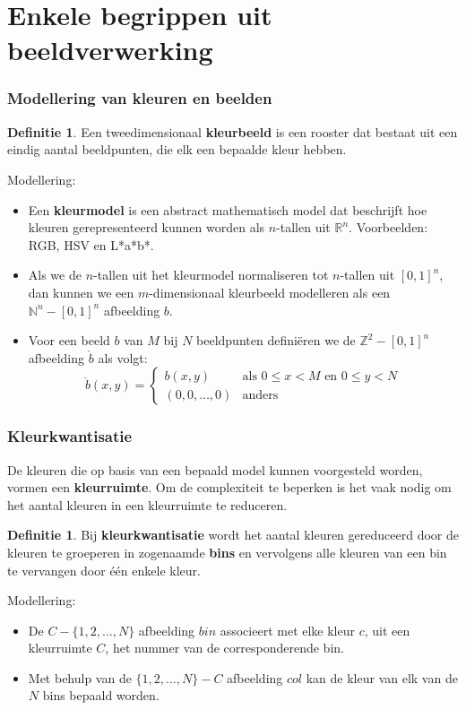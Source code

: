\documentclass[dutch]{beamer}
\theoremstyle{definition}
\newtheorem{definitie}[theorem]{Definitie}
\theoremstyle{remark}
\theoremstyle{example}
\begin{document}
\section{Enkele begrippen uit beeldverwerking}
\frame
{
  \frametitle{Modellering van kleuren en beelden}

  \begin{definitie}
  Een tweedimensionaal \textbf{kleurbeeld} is een rooster dat bestaat uit een eindig aantal
  beeldpunten, die elk een bepaalde kleur hebben. 
  \end{definitie}
  
  Modellering:
  \begin{itemize}
    \item Een \textbf{kleurmodel} is een abstract mathematisch model dat beschrijft
    hoe kleuren gerepresenteerd kunnen worden als $n$-tallen uit $\mathbb{R}^n$.
    Voorbeelden: RGB, HSV en L*a*b*.
    \item Als we de $n$-tallen uit het
    kleurmodel normaliseren tot $n$-tallen uit $[0,1]^n$, dan kunnen we een
    $m$-dimensionaal kleurbeeld modelleren als een $\mathbb{N}^n - [0,1]^n$
    afbeelding $b$.
    \item Voor een beeld $b$ van $M$ bij $N$ beeldpunten defini\"eren we de
    $\mathbb{Z}^2 - [0,1]^n$ afbeelding $\mathring{b}$ als volgt:
    \begin{displaymath}
    \mathring{b}(x,y) = \begin{cases} 
    b(x,y) & \text{als } 0 \le x < M \text{ en } 0 \le y < N \\
    (0,0,\ldots,0) & \text{anders}
    \end{cases}
    \end{displaymath}
  \end{itemize}
}
\frame
{
  \frametitle{Kleurkwantisatie}
  
  De kleuren die op basis van een bepaald model kunnen voorgesteld worden, vormen
  een \textbf{kleurruimte}. Om de complexiteit te beperken is het vaak nodig om 
  het aantal kleuren in een kleurruimte te reduceren.
  
  \begin{definitie}
  Bij \textbf{kleurkwantisatie} wordt het aantal kleuren gereduceerd door 
  de kleuren te groeperen in zogenaamde \textbf{bins} en vervolgens alle kleuren van 
  een bin te vervangen door \'e\'en enkele kleur.
  \end{definitie}
  
  Modellering:
  \begin{itemize}
    \item De $C - \{1,2,\ldots,N\}$ afbeelding $bin$ associeert met elke kleur $c$, 
    uit een kleurruimte $C$, het nummer van de corresponderende bin.
    \item Met behulp van de $\{1,2,\ldots,N\} - C$ afbeelding $col$ kan de kleur van 
    elk van de $N$ bins bepaald worden.
  \end{itemize}
}
\end{document}
